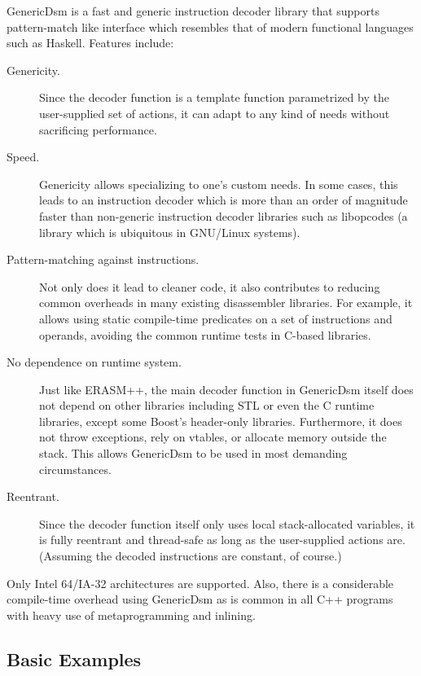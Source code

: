 \documentclass{article}
\begin{document}
GenericDsm is a fast and generic instruction decoder library
that supports pattern-match like interface which resembles that of
modern functional languages such as Haskell. Features include:
\begin{description}
\item [Genericity.] Since the decoder function is a template function
  parametrized by the user-supplied set of actions, it can adapt to
  any kind of needs without sacrificing performance.

\item[Speed.] Genericity allows specializing to one's custom needs. In
  some cases, this leads to an instruction decoder which is more than 
  an order  of magnitude faster than non-generic instruction decoder
  libraries such as libopcodes (a library which is ubiquitous in
  GNU/Linux systems).

\item[Pattern-matching against instructions.] Not only does it lead to
  cleaner code, it also contributes to reducing common overheads in
  many existing disassembler libraries. For example, it allows using
  static compile-time predicates on a set of instructions and
  operands, avoiding the common runtime tests in C-based libraries.

\item[No dependence on runtime system.] Just like ERASM++, the main
  decoder function in GenericDsm itself does not depend on other
  libraries including STL or even the C runtime libraries, except some
  Boost's header-only libraries. Furthermore, it does not throw
  exceptions, rely on vtables, or allocate memory outside the
  stack. This allows GenericDsm to be used in most demanding
  circumstances.

\item [Reentrant.] Since the decoder function itself only uses local
  stack-allocated variables, it is fully reentrant and thread-safe as
  long as the user-supplied actions are. (Assuming the decoded
  instructions are constant, of course.)

\end{description}

Only Intel 64/IA-32 architectures are supported. Also, there is a
considerable compile-time overhead using GenericDsm as is
common in all C++ programs with heavy use of metaprogramming and
inlining.

\subsection{Basic Examples}
\label{sec:basic-examples-1}
\end{document}
